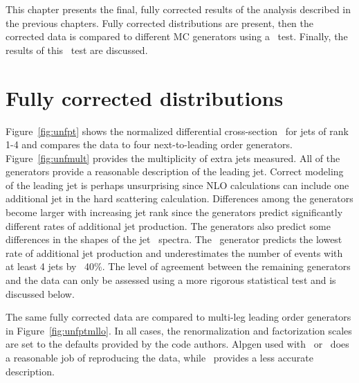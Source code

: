 
This chapter presents the final, fully corrected results of the analysis described in the previous chapters. Fully corrected distributions are present, then the corrected data is compared to different MC generators using a \chisq\ test. Finally, the results of this \chisq\ test are discussed.
\section{Fully corrected distributions}
Figure~\ref{fig:unfpt} shows the normalized differential cross-section \sigmapti\ for jets of rank 1-4 and compares the data to 
four next-to-leading order generators.  Figure~\ref{fig:unfmult} provides the multiplicity of extra jets measured.
All of the generators provide a reasonable description of the leading jet. 
Correct modeling of the leading jet is perhaps unsurprising since NLO calculations can include one additional jet in the hard scattering calculation. 
Differences among the generators become larger with increasing jet rank since the generators predict significantly different rates of additional jet production. 
The generators also predict some differences in the shapes of the jet \pt\ spectra.
The \mcnlohw\ generator predicts the lowest rate of additional jet production and underestimates the number of events with at least 4 jets by ~40\%.
The level of agreement between the remaining generators and the data can only be assessed using a more rigorous statistical test and is discussed below.


The same fully corrected data are compared to multi-leg leading order generators in Figure~\ref{fig:unfptmllo}.  In all cases, the renormalization and
factorization scales are set to the defaults provided by the code authors.  Alpgen used with \py\ or \hw\ does a reasonable job of reproducing the data, while \madpy\ provides a less accurate description.

